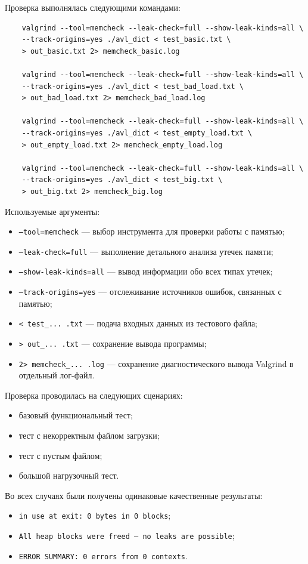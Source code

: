 \documentclass[12pt]{article}
\begin{document}
Проверка выполнялась следующими командами:

\begin{verbatim}
	valgrind --tool=memcheck --leak-check=full --show-leak-kinds=all \
	--track-origins=yes ./avl_dict < test_basic.txt \
	> out_basic.txt 2> memcheck_basic.log
	
	valgrind --tool=memcheck --leak-check=full --show-leak-kinds=all \
	--track-origins=yes ./avl_dict < test_bad_load.txt \
	> out_bad_load.txt 2> memcheck_bad_load.log
	
	valgrind --tool=memcheck --leak-check=full --show-leak-kinds=all \
	--track-origins=yes ./avl_dict < test_empty_load.txt \
	> out_empty_load.txt 2> memcheck_empty_load.log
	
	valgrind --tool=memcheck --leak-check=full --show-leak-kinds=all \
	--track-origins=yes ./avl_dict < test_big.txt \
	> out_big.txt 2> memcheck_big.log
\end{verbatim}

Используемые аргументы:
\begin{itemize}
	\item \texttt{--tool=memcheck} — выбор инструмента для проверки работы с памятью;
	\item \texttt{--leak-check=full} — выполнение детального анализа утечек памяти;
	\item \texttt{--show-leak-kinds=all} — вывод информации обо всех типах утечек;
	\item \texttt{--track-origins=yes} — отслеживание источников ошибок, связанных с памятью;
	\item \texttt{< test\_...\ .txt} — подача входных данных из тестового файла;
	\item \texttt{> out\_...\ .txt} — сохранение вывода программы;
	\item \texttt{2> memcheck\_...\ .log} — сохранение диагностического вывода Valgrind в отдельный лог-файл.
\end{itemize}

Проверка проводилась на следующих сценариях:
\begin{itemize}
	\item базовый функциональный тест;
	\item тест с некорректным файлом загрузки;
	\item тест с пустым файлом;
	\item большой нагрузочный тест.
\end{itemize}

Во всех случаях были получены одинаковые качественные результаты:
\begin{itemize}
	\item \texttt{in use at exit: 0 bytes in 0 blocks};
	\item \texttt{All heap blocks were freed -- no leaks are possible};
	\item \texttt{ERROR SUMMARY: 0 errors from 0 contexts}.
\end{itemize}
\end{document}
